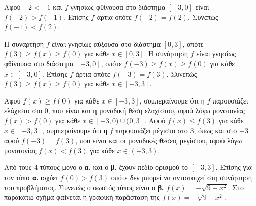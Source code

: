 \begin{alist}
\item Αφού $-2 < -1$ και $f$ γνησίως φθίνουσα στο διάστημα $[-3, 0]$ είναι $f(-2) > f(-1)$.
Επίσης $f$ άρτια οπότε $f(-2) = f(2)$. Συνεπώς $f(-1) < f(2)$.
\item Η συνάρτηση $f$ είναι γνησίως αύξουσα στο διάστημα $[0, 3]$, οπότε $f(3) \ge f(x) \ge f(0)$ για κάθε $x \in [0, 3]$.
Η συνάρτηση $f$ είναι γνησίως φθίνουσα στο διάστημα $[-3, 0]$, οπότε $f(-3) \ge f(x) \ge f(0)$ για κάθε $x \in [-3, 0]$.
Επίσης $f$ άρτια οπότε $f(-3) = f(3)$.
Συνεπώς $f(3) \ge f(x) \ge f(0)$ για κάθε $x \in [-3, 3]$.
\item Αφού $f(x) \ge f(0)$ για κάθε $x \in [-3, 3]$, συμπεραίνουμε ότι η $f$ παρουσιάζει ελάχιστο στο $0$, που είναι και η μοναδική θέση ελαχίστου, αφού λόγω μονοτονίας $f(x) > f(0)$ για κάθε $x \in [-3, 0) \cup (0, 3]$.
Αφού $f(x) \le f(3)$ για κάθε $x \in [-3, 3]$, συμπεραίνουμε ότι η $f$ παρουσιάζει μέγιστο στο $3$, όπως και στο $-3$ αφού $f(-3) = f(3)$, που είναι και οι μοναδικές θέσεις μεγίστου, αφού λόγω μονοτονίας $f(x) < f(3)$ για κάθε $x \in (-3, 3)$.
\item Από τους $4$ τύπους μόνο ο \textbf{α.} και ο \textbf{β.} έχουν πεδίο ορισμού το $[-3, 3]$.
Επίσης για τον τύπο \textbf{α.} ισχύει $f(0) > f(3)$ οπότε δεν μπορεί να αντιστοιχεί στη συνάρτηση του προβλήματος. Συνεπώς ο σωστός τύπος είναι ο \textbf{β.} $f(x) = -\sqrt{9 - x^2}$.
Στο παρακάτω σχήμα φαίνεται η γραφική παράσταση της $f(x) = -\sqrt{9 - x^2}$.
\begin{center}
\end{center}
\end{alist}

